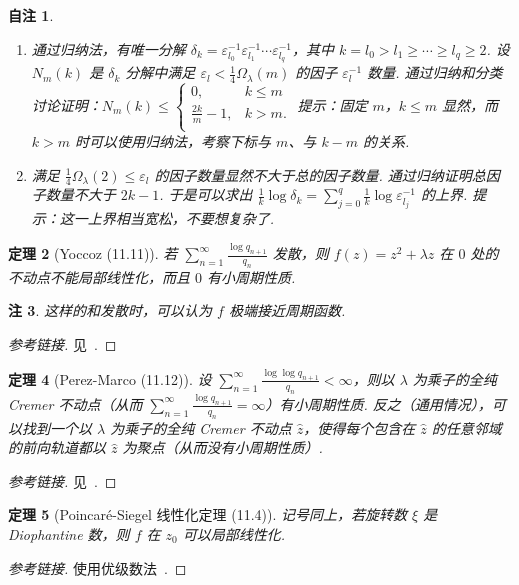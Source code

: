 \documentclass[11pt, a4paper, oneside]{ctexart}
\newtheorem{theorem}{定理}[section]
\newtheorem{note}[theorem]{自注}
\newtheorem{remark}[theorem]{注}
\begin{document}
\begin{note}
\begin{enumerate}[(1)]
            \item 通过归纳法，有唯一分解 $\delta_k=\varepsilon_{l_0}^{-1}\varepsilon_{l_1}^{-1}\cdots\varepsilon_{l_q}^{-1}$，其中 $k=l_0>l_1\geq \cdots\geq l_q\geq 2$. 设 $N_m(k)$ 是 $\delta_k$ 分解中满足 $\varepsilon_l<\frac{1}{4}\Omega_{\lambda}(m)$ 的因子 $\varepsilon_l^{-1}$ 数量. 通过归纳和分类讨论证明：$N_m(k)\leq\begin{cases}
                0,&k\leq m\\
                \frac{2k}{m}-1,&k>m.\\
            \end{cases}$ 提示：固定 $m$，$k\leq m$ 显然，而 $k>m$ 时可以使用归纳法，考察下标与 $m$、与 $k-m$ 的关系.
            \item 满足 $\frac{1}{4}\Omega_{\lambda}(2)\leq \varepsilon_l$ 的因子数量显然不大于总的因子数量. 通过归纳证明总因子数量不大于 $2k-1$. 于是可以求出 $\frac{1}{k}\log\delta_k=\sum\limits_{j=0}^{q}\frac{1}{k}\log\varepsilon_{l_j}^{-1}$ 的上界. 提示：这一上界相当宽松，不要想复杂了.
        \end{enumerate}
    \end{note}

    \begin{theorem}[Yoccoz (11.11)]
        若 $\sum\limits_{n=1}^{\infty}\frac{\log q_{n+1}}{q_n}$ 发散，则 $f(z)=z^2+\lambda z$ 在 $0$ 处的不动点不能局部线性化，而且 $0$ 有小周期性质.
    \end{theorem}
    \begin{remark}
        这样的和发散时，可以认为 $f$ 极端接近周期函数.
    \end{remark}
    \begin{proof}[参考链接]
        见~\cite{yoccoz}.
    \end{proof}

    \begin{theorem}[Perez-Marco (11.12)]
        设 $\sum\limits_{n=1}^{\infty}\frac{\log\log q_{n+1}}{q_n}<\infty$，则以 $\lambda$ 为乘子的全纯 Cremer 不动点（从而 $\sum\limits_{n=1}^{\infty}\frac{\log q_{n+1}}{q_n}=\infty$）有小周期性质. 反之（通用情况），可以找到一个以 $\lambda$ 为乘子的全纯 Cremer 不动点 $\hat{z}$，使得每个包含在 $\hat{z}$ 的任意邻域的前向轨道都以 $\hat{z}$ 为聚点（从而没有小周期性质）.
    \end{theorem}
    \begin{proof}[参考链接]
        见~\cite{marco}.
    \end{proof}

    \begin{theorem}[Poincaré-Siegel 线性化定理 (11.4)]\label{定理11.4}
        记号同上，若旋转数 $\xi$ 是 Diophantine 数，则 $f$ 在 $z_0$ 可以局部线性化.
    \end{theorem}
    \begin{proof}[参考链接]
        使用优级数法~\cite{katok}.
    \end{proof}
\end{document}

